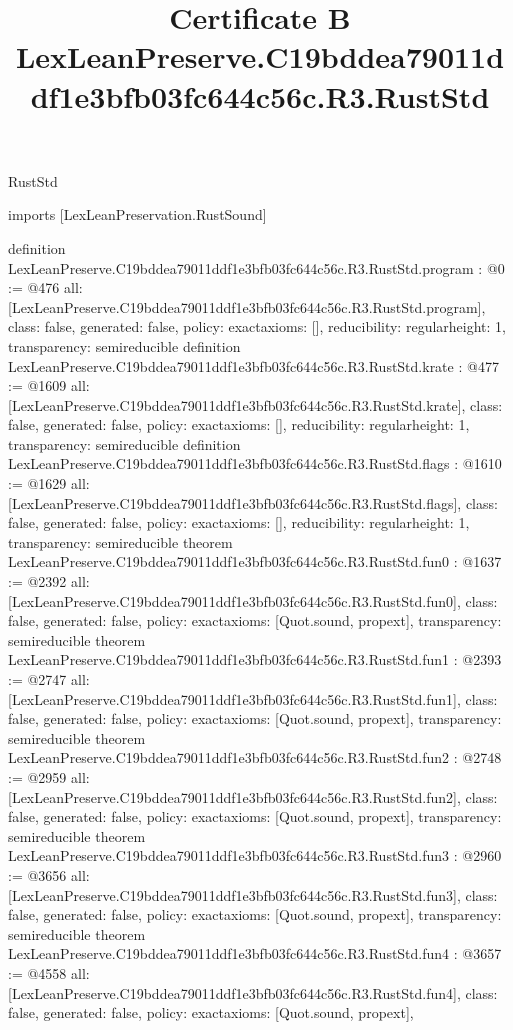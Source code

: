 \begin{lexlean}{RustStd}
\title{Certificate B LexLeanPreserve.C19bddea79011ddf1e3bfb03fc644c56c.R3.RustStd}
\begin{coremodule}
imports [LexLeanPreservation.RustSound]

definition LexLeanPreserve.C19bddea79011ddf1e3bfb03fc644c56c.R3.RustStd.program : @0 := @476 {
  all: [LexLeanPreserve.C19bddea79011ddf1e3bfb03fc644c56c.R3.RustStd.program],
  class: false,
  generated: false,
  policy: exact{axioms: []},
  reducibility: regular{height: 1},
  transparency: semireducible
}
definition LexLeanPreserve.C19bddea79011ddf1e3bfb03fc644c56c.R3.RustStd.krate : @477 := @1609 {
  all: [LexLeanPreserve.C19bddea79011ddf1e3bfb03fc644c56c.R3.RustStd.krate],
  class: false,
  generated: false,
  policy: exact{axioms: []},
  reducibility: regular{height: 1},
  transparency: semireducible
}
definition LexLeanPreserve.C19bddea79011ddf1e3bfb03fc644c56c.R3.RustStd.flags : @1610 := @1629 {
  all: [LexLeanPreserve.C19bddea79011ddf1e3bfb03fc644c56c.R3.RustStd.flags],
  class: false,
  generated: false,
  policy: exact{axioms: []},
  reducibility: regular{height: 1},
  transparency: semireducible
}
theorem LexLeanPreserve.C19bddea79011ddf1e3bfb03fc644c56c.R3.RustStd.fun0 : @1637 := @2392 {
  all: [LexLeanPreserve.C19bddea79011ddf1e3bfb03fc644c56c.R3.RustStd.fun0],
  class: false,
  generated: false,
  policy: exact{axioms: [Quot.sound, propext]},
  transparency: semireducible
}
theorem LexLeanPreserve.C19bddea79011ddf1e3bfb03fc644c56c.R3.RustStd.fun1 : @2393 := @2747 {
  all: [LexLeanPreserve.C19bddea79011ddf1e3bfb03fc644c56c.R3.RustStd.fun1],
  class: false,
  generated: false,
  policy: exact{axioms: [Quot.sound, propext]},
  transparency: semireducible
}
theorem LexLeanPreserve.C19bddea79011ddf1e3bfb03fc644c56c.R3.RustStd.fun2 : @2748 := @2959 {
  all: [LexLeanPreserve.C19bddea79011ddf1e3bfb03fc644c56c.R3.RustStd.fun2],
  class: false,
  generated: false,
  policy: exact{axioms: [Quot.sound, propext]},
  transparency: semireducible
}
theorem LexLeanPreserve.C19bddea79011ddf1e3bfb03fc644c56c.R3.RustStd.fun3 : @2960 := @3656 {
  all: [LexLeanPreserve.C19bddea79011ddf1e3bfb03fc644c56c.R3.RustStd.fun3],
  class: false,
  generated: false,
  policy: exact{axioms: [Quot.sound, propext]},
  transparency: semireducible
}
theorem LexLeanPreserve.C19bddea79011ddf1e3bfb03fc644c56c.R3.RustStd.fun4 : @3657 := @4558 {
  all: [LexLeanPreserve.C19bddea79011ddf1e3bfb03fc644c56c.R3.RustStd.fun4],
  class: false,
  generated: false,
  policy: exact{axioms: [Quot.sound, propext]},
}
\end{coremodule}
\end{lexlean}

